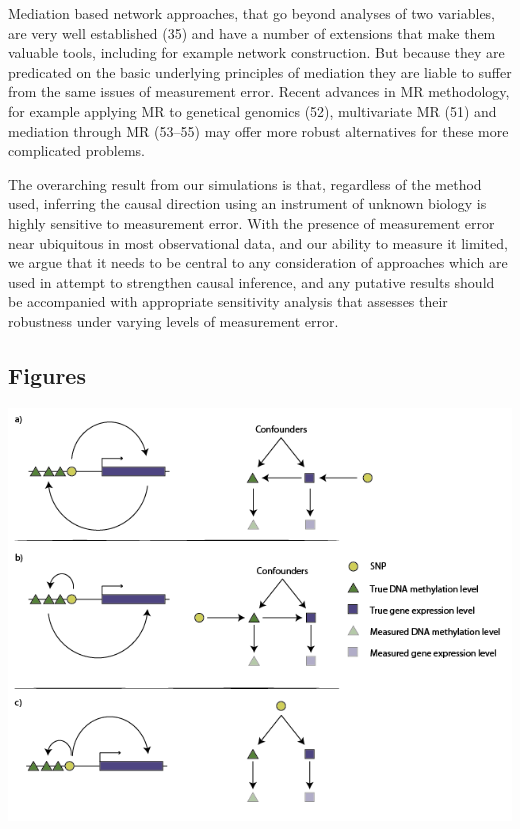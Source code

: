 \documentclass[]{article}
\begin{document}
Mediation based network approaches, that go beyond analyses of two
variables, are very well established (35) and have a number of
extensions that make them valuable tools, including for example network
construction. But because they are predicated on the basic underlying
principles of mediation they are liable to suffer from the same issues
of measurement error. Recent advances in MR methodology, for example
applying MR to genetical genomics (52), multivariate MR (51) and
mediation through MR (53--55) may offer more robust alternatives for
these more complicated problems.

The overarching result from our simulations is that, regardless of the
method used, inferring the causal direction using an instrument of
unknown biology is highly sensitive to measurement error. With the
presence of measurement error near ubiquitous in most observational
data, and our ability to measure it limited, we argue that it needs to
be central to any consideration of approaches which are used in attempt
to strengthen causal inference, and any putative results should be
accompanied with appropriate sensitivity analysis that assesses their
robustness under varying levels of measurement error.

\newpage

\subsection{Figures}\label{figures}

\includegraphics{../images/dag-01.png}
\end{document}
